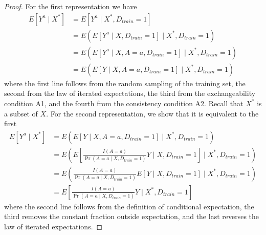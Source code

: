     \begin{proof}
        For the first representation we have 
        \begin{align*}
            E[Y^a \mid X^*] & = E[Y^a \mid X^*, D_{train} = 1] \\
            & = E(E[Y^a\mid X, D_{train} = 1] \mid X^*, D_{train} = 1) \\
            & = E(E[Y^a\mid X, A = a, D_{train} = 1] \mid X^*, D_{train} = 1) \\
            & = E(E[Y \mid X, A = a, D_{train} = 1] \mid X^*, D_{train} = 1) 
        \end{align*}
        where the first line follows from the random sampling of the training set, the second from the law of iterated expectations, the third from the exchangeability condition A1, and the fourth from the consistency condition A2. Recall that $X^*$ is a subset of $X$. For the second representation, we show that it is equivalent to the first 
        \begin{align*}
            E[Y^a \mid X^*] &= E(E[Y \mid X, A = a, D_{train} = 1] \mid X^*, D_{train} = 1)  \\
            &= E\left(E\left[\frac{I(A = a)}{\Pr(A = a \mid X,D_{train} = 1)}Y \mid X,D_{train} = 1\right] \mid X^*, D_{train} = 1\right)\\
            &= E\left(\frac{I(A = a)}{\Pr(A = a \mid X,D_{train} = 1)}E\left[Y \mid X,D_{train} = 1\right] \mid X^*, D_{train} = 1\right)\\
            &= E\left[\frac{I(A = a)}{\Pr(A = a \mid X,D_{train} = 1)}Y \mid X^*, D_{train} = 1\right]
        \end{align*}
        where the second line follows from the definition of conditional expectation, the third removes the constant fraction outside expectation, and the last reverses the law of iterated expectations.
    \end{proof}

